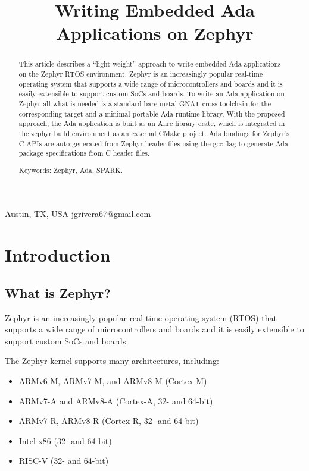 \documentclass{AUJarticle}
\begin{document}
\title{Writing Embedded Ada Applications on Zephyr}

{Austin, TX, USA}
{jgrivera67@gmail.com}



\thispagestyle{plain}

\maketitle

\begin{abstract}

This article describes a ``light-weight'' approach to write embedded
Ada applications on the Zephyr RTOS environment. Zephyr is an increasingly
popular real-time operating system that supports a wide range of microcontrollers
and boards and it is easily extensible to support custom SoCs and boards. To write
an Ada application on Zephyr all what is needed is a standard bare-metal GNAT cross
toolchain for the corresponding target and a minimal portable Ada runtime library.
With the proposed approach, the Ada application is built as an Alire library crate,
which is integrated in the zephyr build environment as an external CMake project.
Ada bindings for Zephyr's C APIs are auto-generated from Zephyr header files using
the gcc flag to generate Ada package specifications from C header files.

Keywords: Zephyr, Ada, SPARK.

\end{abstract}

\section{Introduction}

\subsection{What is Zephyr?}

Zephyr \cite{Zephyr1} is an increasingly popular real-time operating system (RTOS) that
supports a wide range of microcontrollers and boards and it is easily extensible to support
custom SoCs and boards.

The Zephyr kernel supports many architectures, including:
\begin{itemize}
\item ARMv6-M, ARMv7-M, and ARMv8-M (Cortex-M)
\item ARMv7-A and ARMv8-A (Cortex-A, 32- and 64-bit)
\item ARMv7-R, ARMv8-R (Cortex-R, 32- and 64-bit)
\item Intel x86 (32- and 64-bit)
\item RISC-V (32- and 64-bit)
\end{itemize}
\end{document}
